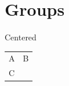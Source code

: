 \documentclass{article}
\begin{document}
\section{Groups}\label{sec:grp}
{\begin{center}Centered~\cite{k1}\end{center}}
{\small\begin{tabular}{ll}A & B \\ C & \cite{k2}\end{tabular}}


\end{document}

